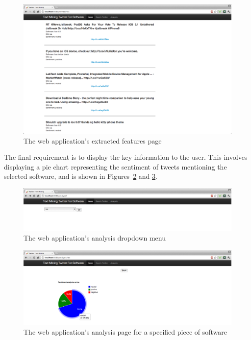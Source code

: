 \begin{figure}[h]
\begin{center}
\includegraphics[width=15cm]{gui3}
\end{center}
\caption{The web application's extracted features page}
\label{fig:gui3}
\end{figure}

The final requirement is to display the key information to the user. This involves displaying a pie chart representing the sentiment of tweets mentioning the selected software, and is shown in Figures~\ref{fig:gui4} and \ref{fig:gui5}.

\begin{figure}[h]
\begin{center}
\includegraphics[width=15cm]{gui4}
\end{center}
\caption{The web application's analysis dropdown menu}
\label{fig:gui4}
\end{figure}

\begin{figure}[h]
\begin{center}
\includegraphics[width=15cm]{gui5}
\end{center}
\caption{The web application's analysis page for a specified piece of software}
\label{fig:gui5}
\end{figure}
